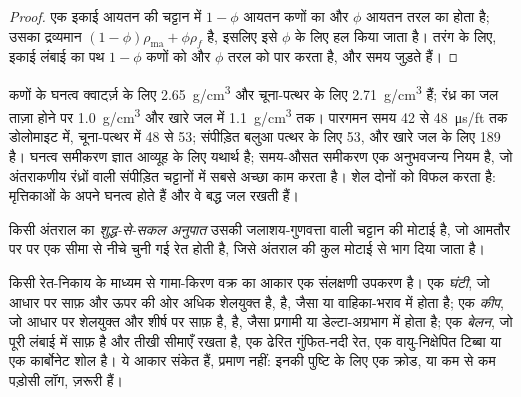 \begin{proof}
एक इकाई आयतन की चट्टान में $1 - \phi$ आयतन कणों का और $\phi$ आयतन तरल का होता है;
उसका द्रव्यमान $(1 - \phi)\rho_{\mathrm{ma}} + \phi\rho_f$ है, इसलिए इसे
$\phi$ के लिए हल किया जाता है। तरंग के लिए, इकाई लंबाई का पथ $1 - \phi$ कणों को
और $\phi$ तरल को पार करता है, और समय जुड़ते हैं।
\end{proof}

कणों के घनत्व क्वार्ट्ज़ के लिए \qty{2.65}{g/cm^3} और चूना-पत्थर के लिए \qty{2.71}{g/cm^3} हैं;
रंध्र का जल ताज़ा होने पर \qty{1.0}{g/cm^3} और
खारे जल में \qty{1.1}{g/cm^3} तक। पारगमन समय 42 से
\qty{48}{\micro\second/ft} तक डोलोमाइट में, चूना-पत्थर में 48 से 53;
संपीड़ित बलुआ पत्थर के लिए 53, और खारे जल के लिए 189 है। घनत्व समीकरण
ज्ञात आव्यूह के लिए यथार्थ है; समय-औसत समीकरण एक अनुभवजन्य नियम है, जो
अंतराकणीय रंध्रों वाली संपीड़ित चट्टानों में सबसे अच्छा काम करता है। शेल दोनों को
विफल करता है: मृत्तिकाओं के अपने घनत्व होते हैं और वे बद्ध जल रखती हैं।

\begin{definition}[शुद्ध-से-सकल अनुपात]\label{def:b3:facies-models:ntg}
किसी अंतराल का \emph{शुद्ध-से-सकल अनुपात} उसकी जलाशय-गुणवत्ता वाली चट्टान की
मोटाई है, जो आमतौर पर  पर एक सीमा से नीचे चुनी गई रेत होती है, जिसे अंतराल की कुल मोटाई से भाग दिया जाता है।
\end{definition}

किसी रेत-निकाय के माध्यम से गामा-किरण वक्र का आकार एक संलक्षणी उपकरण है।
एक \emph{घंटी}, जो आधार पर साफ़ और ऊपर की ओर अधिक शेलयुक्त है,  है,
जैसा  या वाहिका-भराव में होता है; एक \emph{कीप}, जो आधार पर शेलयुक्त और
शीर्ष पर साफ़ है,  है, जैसा प्रगामी  या
डेल्टा-अग्रभाग में होता है; एक \emph{बेलन}, जो पूरी लंबाई में साफ़ है और
तीखी सीमाएँ रखता है, एक ढेरित गुंफित-नदी रेत, एक वायु-निक्षेपित टिब्बा या एक
कार्बोनेट शोल है। ये आकार संकेत हैं, प्रमाण नहीं: इनकी पुष्टि के लिए एक क्रोड, या कम से कम
पड़ोसी लॉग, ज़रूरी हैं।

